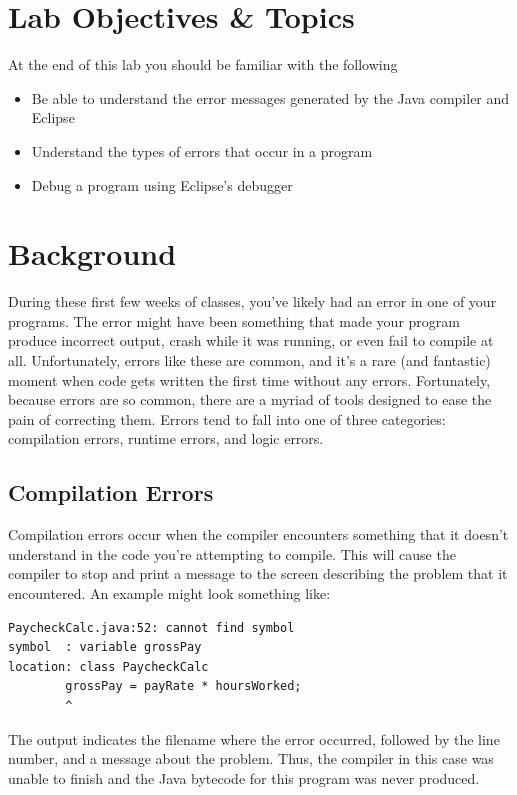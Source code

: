 \documentclass[12pt]{scrartcl}
\begin{document}
\section{Lab Objectives \& Topics}
At the end of this lab you should be familiar with the following
\begin{itemize}
  \item Be able to understand the error messages generated by 
  	the Java compiler and Eclipse
  \item Understand the types of errors that occur in a program
  \item Debug a program using Eclipse's debugger 
\end{itemize}

\section{Background}

During these first few weeks of classes, you've likely had an error in 
one of your programs.  The error might have been something that 
made your program produce incorrect output, crash while it was 
running, or even fail to compile at all.  Unfortunately, errors like these 
are common, and it's a rare (and fantastic) moment when code gets 
written the first time without any errors.  Fortunately, because errors 
are so common, there are a myriad of tools designed to ease the pain 
of correcting them.  Errors tend to fall into one of three categories: 
compilation errors, runtime errors, and logic errors.  

\subsection*{Compilation Errors}

Compilation errors occur when the compiler encounters something 
that it doesn't understand in the code you're attempting to compile.  
This will cause the compiler to stop and print a message to the 
screen describing the problem that it encountered.  An example 
might look something like:

\begin{verbatim}
PaycheckCalc.java:52: cannot find symbol
symbol  : variable grossPay
location: class PaycheckCalc
        grossPay = payRate * hoursWorked;
        ^
\end{verbatim}

The output indicates the filename where the error occurred, followed 
by the line number, and a message about the problem.  Thus, the 
compiler in this case was unable to finish and the Java bytecode for 
this program was never produced.
\end{document}
